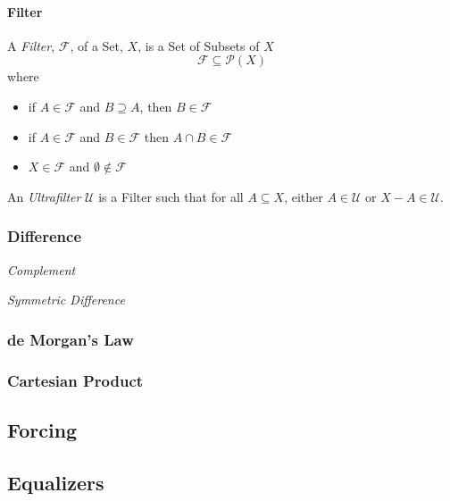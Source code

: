 \paragraph{Filter}

A \emph{Filter}, $\mathcal{F}$, of a Set, $X$, is a Set of Subsets of
$X$
\[
    \mathcal{F} \subseteq \mathcal{P}(X)
\]
where
\begin{itemize}
\item if $A \in \mathcal{F}$ and $B \supseteq A$, then $B \in
  \mathcal{F}$
\item if $A \in \mathcal{F}$ and $B \in \mathcal{F}$ then $A \cap B
  \in \mathcal{F}$
\item $X \in \mathcal{F}$ and $\emptyset \notin \mathcal{F}$
\end{itemize}
An \emph{Ultrafilter} $\mathcal{U}$ is a Filter such that for all $A
\subseteq X$, either $A \in \mathcal{U}$ or $X - A \in \mathcal{U}$.



\subsubsection{Difference}\label{sec:set_difference}

\emph{Complement}

\emph{Symmetric Difference}



\subsubsection{de Morgan's Law}\label{sec:de_morgan}

\subsubsection{Cartesian Product}\label{sec:set_product}



\subsection{Forcing}\label{sec:forcing}

\subsection{Equalizers}\label{sec:set_equalizer}

